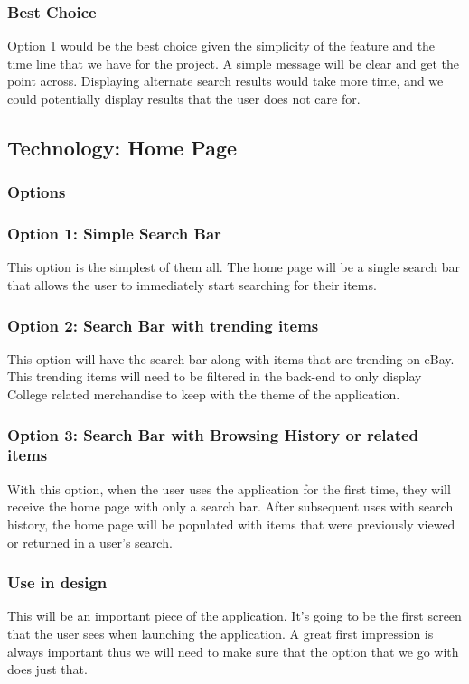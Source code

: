 \documentclass[journal,compsoc, 10pt, draftclsnofoot, onecolumn]{IEEEtran}
\begin{document}
\subsubsection{Best Choice}
Option 1 would be the best choice given the simplicity of the feature and the 
time line that we have for the project. A simple message will be clear and get 
the point across. Displaying alternate search results would take more time, 
and we could potentially display results that the user does not care for.

\subsection{Technology: Home Page}
\subsubsection{Options}
\subsubsection*{Option 1: Simple Search Bar}
This option is the simplest of them all. The home page will be a single search 
bar that allows the user to immediately start searching for their items. 
\subsubsection*{Option 2: Search Bar with trending items}
This option will have the search bar along with items that are trending on eBay. 
This trending items will need to be filtered in the back-end to only display College related merchandise to keep with the theme of the application. 
\subsubsection*{Option 3: Search Bar with Browsing History or related items}
With this option, when the user uses the application for the first time, they 
will receive the home page with only a search bar. After subsequent uses with 
search history, the home page will be populated with items that were previously 
viewed or returned in a user's search.  
\subsubsection{Use in design}
This will be an important piece of the application. It's going to be the first 
screen that the user sees when launching the application. A great first 
impression is always important thus we will need to make sure that the option 
that we go with does just that.
\end{document}
